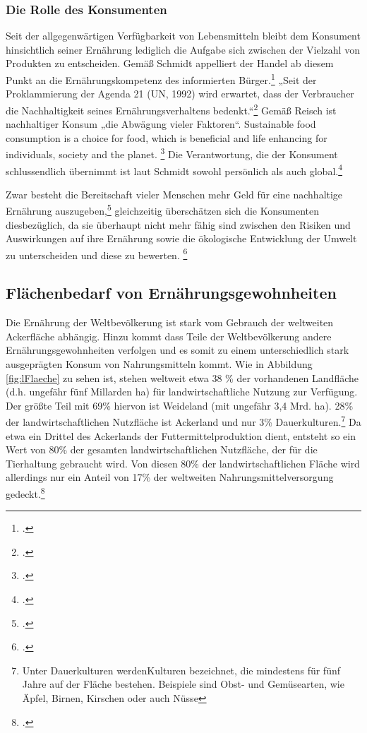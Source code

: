 \documentclass{scrartcl}
\begin{document}
\subsubsection{Die Rolle des Konsumenten}
Seit der allgegenwärtigen Verfügbarkeit von Lebensmitteln bleibt dem Konsument hinsichtlich seiner Ernährung lediglich die Aufgabe sich zwischen der Vielzahl von Produkten zu entscheiden. Gemäß Schmidt appelliert der Handel ab diesem Punkt an die Ernährungskompetenz des informierten Bürger.\footcite[S.20]{SchmidtDieVon} „Seit der Proklammierung der Agenda 21 (UN, 1992) wird erwartet, dass der Verbraucher die Nachhaltigkeit seines Ernährungsverhaltens bedenkt.“\footcite[S.20]{SchmidtDieVon} Gemäß Reisch ist nachhaltiger Konsum „die Abwägung vieler Faktoren“. 
Sustainable food consumption is a choice for food, which is beneficial and life enhancing for individuals, society and the planet. \footcite{article}
Die Verantwortung, die der Konsument schlussendlich übernimmt ist laut Schmidt sowohl persönlich als auch global.\footcite{SchmidtDieVon}

Zwar besteht die Bereitschaft vieler Menschen mehr Geld für eine nachhaltige Ernährung auszugeben,\footcite[Vgl.][S.10f]{Rodiger2015HowReview} gleichzeitig überschätzen sich die Konsumenten diesbezüglich, da sie überhaupt nicht mehr fähig sind zwischen den Risiken und Auswirkungen auf ihre Ernährung sowie die ökologische Entwicklung der Umwelt zu unterscheiden und diese zu bewerten. \footcites[Vgl.][S.10f]{Rodiger2015HowReview}[S.121f]{Stierand2008StadtLebensmittel}\\

\subsection{Flächenbedarf von Ernährungsgewohnheiten} 

Die Ernährung der Weltbevölkerung ist stark vom Gebrauch der weltweiten Ackerfläche abhängig. Hinzu kommt dass Teile der Weltbevölkerung andere Ernährungsgewohnheiten verfolgen und es somit zu einem unterschiedlich stark ausgeprägten Konsum von Nahrungsmitteln kommt. Wie in Abbildung \ref{fig:lFlaeche} zu sehen ist, stehen weltweit etwa 38 \% der vorhandenen Landfläche (d.h. ungefähr fünf Millarden ha) für landwirtschaftliche Nutzung zur Verfügung. Der größte Teil mit 69\% hiervon ist Weideland (mit ungefähr 3,4 Mrd. ha). 28\% der landwirtschaftlichen Nutzfläche ist Ackerland und nur 3\% Dauerkulturen.\footnote{Unter Dauerkulturen werdenKulturen bezeichnet, die mindestens für fünf Jahre auf der Fläche bestehen. Beispiele sind Obst- und Gemüsearten, wie Äpfel, Birnen, Kirschen oder auch Nüsse}
Da etwa ein Drittel des Ackerlands der Futtermittelproduktion dient, entsteht so ein Wert von 80\% der gesamten landwirtschaftlichen Nutzfläche, der für die Tierhaltung gebraucht wird. Von diesen 80\% der landwirtschaftlichen Fläche wird allerdings nur ein Anteil von 17\% 
der weltweiten Nahrungsmittelversorgung gedeckt.\footcites[]{2008FAOSTAT}[Vgl.][S.6]{VonKoerber2008Globale-trends}
\end{document}
